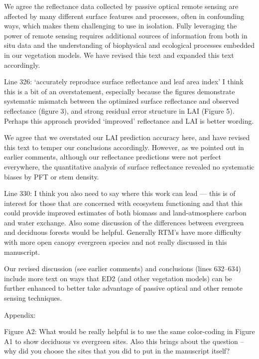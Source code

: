 We agree the reflectance data collected by passive optical remote sensing are affected by many different surface features and processes, often in confounding ways, which makes them challenging to use in isolation.
Fully leveraging the power of remote sensing requires additional sources of information from both in situ data and the understanding of biophysical and ecological processes embedded in our vegetation models.
We have revised this text and expanded this text accordingly.

\begin{reviewer}
  Line 326: ‘accurately reproduce surface reflectance and leaf area index’ I think this is a bit of an overstatement, especially because the figures demonstrate systematic mismatch between the optimized surface reflectance and observed reflectance (figure 3), and strong residual error structure in LAI (Figure 5). Perhaps this approach provided ‘improved’ reflectance and LAI is better wording.
\end{reviewer}

We agree that we overstated our LAI prediction accuracy here, and have revised this text to temper our conclusions accordingly.
However, as we pointed out in earlier comments, although our reflectance predictions were not perfect everywhere, the quantitative analysis of surface reflectance revealed no systematic biases by PFT or stem density.

\begin{reviewer}
  Line 330: I think you also need to say where this work can lead — this is of interest for those that are concerned with ecosystem functioning and that this could provide improved estimates of both biomass and land-atmosphere carbon and water exchange. Also some discussion of the differences between evergreen and deciduous forests would be helpful. Generally RTM’s have more difficulty with more open canopy evergreen species and not really discussed in this manuscript.
\end{reviewer}

Our revised discussion (see earlier comments) and conclusions (lines 632--634) include more text on ways that ED2 (and other vegetation models) can be further enhanced to better take advantage of passive optical and other remote sensing techniques.

\begin{reviewer}
Appendix:

Figure A2: What would be really helpful is to use the same color-coding in Figure A1 to show deciduous vs evergreen sites. Also this brings about the question – why did you choose the sites that you did to put in the manuscript itself?
\end{reviewer}

